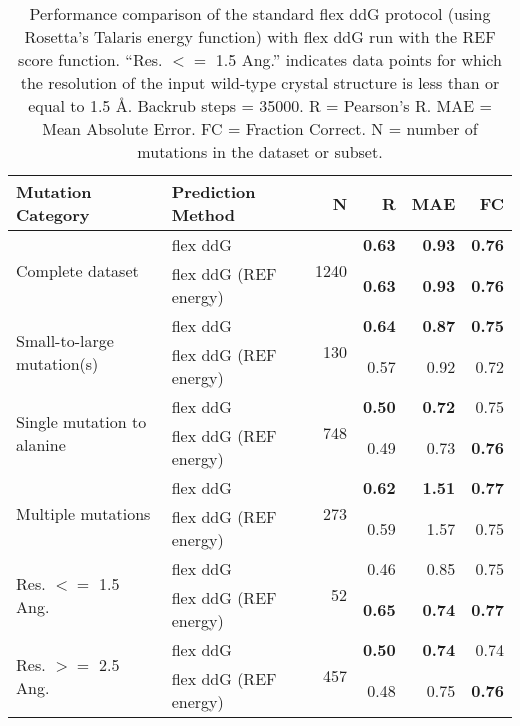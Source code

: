 \begin{table}
  \begin{tabular}{llrrrr}
\toprule
Mutation Category &      Prediction Method &     N &    R &  MAE &   FC \\
\midrule
 \multirow{ 2}{*}{Complete dataset} & flex ddG & \multirow{ 2}{*}{1240} & \textbf{0.63} & \textbf{0.93} & \textbf{0.76}  \\
 & flex ddG (REF energy) & & \textbf{0.63} & \textbf{0.93} & \textbf{0.76}  \\
\hline
 \multirow{ 2}{*}{Small-to-large mutation(s)} & flex ddG & \multirow{ 2}{*}{130} & \textbf{0.64} & \textbf{0.87} & \textbf{0.75}  \\
 & flex ddG (REF energy) & & 0.57 & 0.92 & 0.72  \\
\hline
 \multirow{ 2}{*}{Single mutation to alanine} & flex ddG & \multirow{ 2}{*}{748} & \textbf{0.50} & \textbf{0.72} & 0.75  \\
 & flex ddG (REF energy) & & 0.49 & 0.73 & \textbf{0.76}  \\
\hline
 \multirow{ 2}{*}{Multiple mutations} & flex ddG & \multirow{ 2}{*}{273} & \textbf{0.62} & \textbf{1.51} & \textbf{0.77}  \\
 & flex ddG (REF energy) & & 0.59 & 1.57 & 0.75  \\
\hline
 \multirow{ 2}{*}{Res. $<=$ 1.5 Ang.} & flex ddG & \multirow{ 2}{*}{52} & 0.46 & 0.85 & 0.75  \\
 & flex ddG (REF energy) & & \textbf{0.65} & \textbf{0.74} & \textbf{0.77}  \\
\hline
 \multirow{ 2}{*}{Res. $>=$ 2.5 Ang.} & flex ddG & \multirow{ 2}{*}{457} & \textbf{0.50} & \textbf{0.74} & 0.74  \\
 & flex ddG (REF energy) & & 0.48 & 0.75 & \textbf{0.76}  \\
\bottomrule
\end{tabular}
  \caption[REF results]{
    Performance comparison of the standard flex ddG protocol (using Rosetta's Talaris energy function) with flex ddG run with the REF score function. ``Res. $<=$ 1.5 Ang.'' indicates data points for which the resolution of the input wild-type crystal structure is less than or equal to 1.5 \AA. Backrub steps = 35000. R = Pearson's R. MAE = Mean Absolute Error. FC = Fraction Correct. N = number of mutations in the dataset or subset.
  } \label{tab:table-ref}
\end{table}
